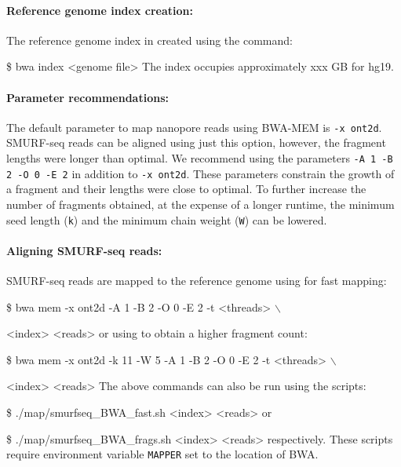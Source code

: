 \documentclass[11pt]{article}
\newenvironment{cmd}
{\list{}{
    \parsep=0em
    \itemindent=17pt
    \listparindent=50pt
    \leftmargin=0in
    \rightmargin=0in
  }\item[] \ttfamily \$}
{\endlist}
\begin{document}
\label{bwa}
\paragraph{Reference genome index creation:}
The reference genome index in created using the command:
\begin{cmd}
  bwa index <genome file>
\end{cmd}
The index occupies approximately xxx GB for hg19.

\paragraph{Parameter recommendations:}
The default parameter to map nanopore reads using BWA-MEM is \texttt{-x~ont2d}.
SMURF-seq reads can be aligned using just this option, however, the fragment
lengths were longer than optimal. We recommend using the parameters
\texttt{-A 1 -B 2 -O 0 -E 2} in addition to \texttt{-x~ont2d}. These
parameters constrain the growth of a fragment and their lengths were close to
optimal. To further increase the number of fragments obtained, at the
expense of a longer runtime, the minimum seed length (\texttt{k}) and the
minimum chain weight (\texttt{W}) can be lowered.


\paragraph{Aligning SMURF-seq reads:}
SMURF-seq reads are mapped to the reference genome using for fast mapping:
\begin{cmd}
  bwa mem -x ont2d -A 1 -B 2 -O 0 -E 2 -t <threads> $\backslash$ \par
  <index> <reads>
\end{cmd}
or using to obtain a higher fragment count:
\begin{cmd}
  bwa mem -x ont2d -k 11 -W 5 -A 1 -B 2 -O 0 -E 2 -t <threads> $\backslash$
  \par <index> <reads>
\end{cmd}
The above commands can also be run using the scripts:
\begin{cmd}
  ./map/smurfseq\_BWA\_fast.sh <index> <reads>
\end{cmd}
or
\begin{cmd}
  ./map/smurfseq\_BWA\_frags.sh <index> <reads>
\end{cmd}
\noindent
respectively. These scripts require environment variable \texttt{MAPPER}
set to the location of BWA.
\end{document}
